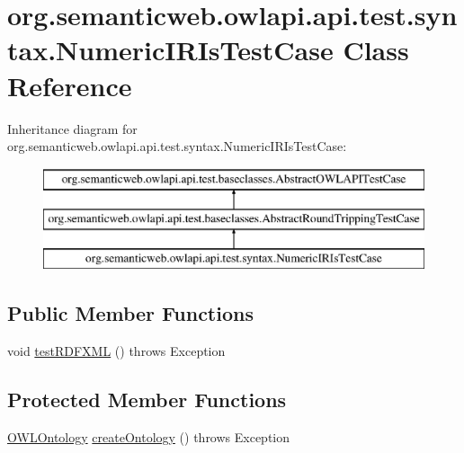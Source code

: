 \hypertarget{classorg_1_1semanticweb_1_1owlapi_1_1api_1_1test_1_1syntax_1_1_numeric_i_r_is_test_case}{\section{org.\-semanticweb.\-owlapi.\-api.\-test.\-syntax.\-Numeric\-I\-R\-Is\-Test\-Case Class Reference}
\label{classorg_1_1semanticweb_1_1owlapi_1_1api_1_1test_1_1syntax_1_1_numeric_i_r_is_test_case}
}
Inheritance diagram for org.\-semanticweb.\-owlapi.\-api.\-test.\-syntax.\-Numeric\-I\-R\-Is\-Test\-Case\-:\begin{figure}[H]
\begin{center}
\leavevmode
\includegraphics[height=3.000000cm]{classorg_1_1semanticweb_1_1owlapi_1_1api_1_1test_1_1syntax_1_1_numeric_i_r_is_test_case}
\end{center}
\end{figure}
\subsection*{Public Member Functions}
\begin{DoxyCompactItemize}
\item 
void \hyperlink{classorg_1_1semanticweb_1_1owlapi_1_1api_1_1test_1_1syntax_1_1_numeric_i_r_is_test_case_a70fa4f2c00094f24222f74d5ae3a31cd}{test\-R\-D\-F\-X\-M\-L} ()  throws Exception 
\end{DoxyCompactItemize}
\subsection*{Protected Member Functions}
\begin{DoxyCompactItemize}
\item 
\hyperlink{interfaceorg_1_1semanticweb_1_1owlapi_1_1model_1_1_o_w_l_ontology}{O\-W\-L\-Ontology} \hyperlink{classorg_1_1semanticweb_1_1owlapi_1_1api_1_1test_1_1syntax_1_1_numeric_i_r_is_test_case_aaeb9ccde347bdd7c88c7e0fd97bb6c17}{create\-Ontology} ()  throws Exception 
\end{DoxyCompactItemize}
